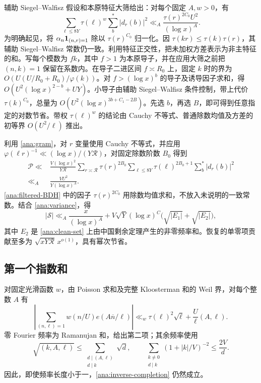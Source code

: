 辅助 Siegel--Walfisz 假设和本原特征大筛给出：对每个固定 $A,w>0$，有
\begin{equation}
 \sum_{\ell\le8Y}\tau(\ell)^w\sum_b^*|d_r(b)|^2
       \ll_A\frac{\tau(r)^{2C_0}U^2}{(\log x)^A}.
 \label{ana:filtered-BDH}
\end{equation}
为明确起见，将 $\alpha_n\mathbf 1_{(n,r)=1}$ 除以 $\tau(r)^{C_0}$ 归一化。因 $\tau(kr)\le\tau(k)\tau(r)$，其辅助 Siegel--Walfisz 常数仍一致。利用特征正交性，把未加权方差表示为非主特征的和。写每个模数为 $fk$，其中 $f>1$ 为本原导子，并在应用大筛之前把 $(n,k)=1$ 保留在系数内。在导子二进区间 $f\asymp R_0$ 上，固定 $k$ 时的界为 $O(U(U/R_0+R_0)/\varphi(k))$。对 $f>(\log x)^b$ 的导子及诱导因子求和，得 $O(U^2(\log x)^{2-b}+UY)$。小导子由辅助 Siegel--Walfisz 条件控制，带上代价 $\tau(k)^{C_0}$，总量为 $O(U^2(\log x)^{3b+C_1-2B})$。先选 $b$，再选 $B$，即可得到任意指定的对数节省。带权 $\tau(\ell)^w$ 的结论由 Cauchy 不等式、普通除数均值及方差的初等界 $O(U^2/\ell)$ 推出。

利用 \eqref{ana:gram}，对 $r$ 变量使用 Cauchy 不等式，并应用 $\varphi(\ell r)^{-1}\ll(\log x)/(Y\mathcal R)$，对固定除数阶数 $B_0$ 得到
\begin{align*}
 \mathcal P\ll{}&\frac{V(\log x)^2}{Y\mathcal R}
  \sum_{r\asymp\mathcal R}\tau(r)^{2B_0}
  \sum_{\ell\le8Y}\tau(\ell)^{2B_0+1}\sum_b^*|d_r(b)|^2\\
 \ll_A{}&\frac{VU^2}{Y(\log x)^A}.
\end{align*}
\eqref{ana:filtered-BDH} 中的因子 $\tau(r)^{2C_0}$ 用除数均值求和，不放入未说明的一致常数。结合 \eqref{ana:variance}，得
\begin{equation}
 |\mathcal S|\ll_A\frac{x}{(\log x)^A}
  +V\sqrt Y(\log x)^C\bigl(\sqrt{|E_1|}+\sqrt{|E_2|}\bigr),
 \label{ana:dispersion-bound}
\end{equation}
其中 $E_2$ 是 \eqref{ana:clean-set} 上由中国剩余定理产生的非零频率和。恢复的单零项贡献至多为 $\sqrt{xY\mathcal R}\,x^{o(1)}$，具有幂次节省。

\subsection{第一个指数和}

对固定光滑函数 $w$，由 Poisson 求和及完整 Kloosterman 和的 Weil 界，对每个整数 $A$ 有
\begin{equation}
 \left|\sum_{(n,\ell)=1}w(n/U)e(A\overline n/\ell)\right|
 \ll_w \tau(\ell)^2\sqrt{\ell}+\frac U{\ell}(A,\ell).
 \label{ana:inverse-completion}
\end{equation}
零 Fourier 频率为 Ramanujan 和，给出第二项；其余频率使用
\[
 \sqrt{(k,A,\ell)}\le\sum_{\substack{d\mid(A,\ell)\\d\mid k}}\sqrt d,
 \qquad
 \sum_{\substack{k\ne0\\d\mid k}}(1+|k|/V)^{-2}\le\frac{2V}{d}.
\]
因此，即使频率长度小于一，\eqref{ana:inverse-completion} 仍然成立。

